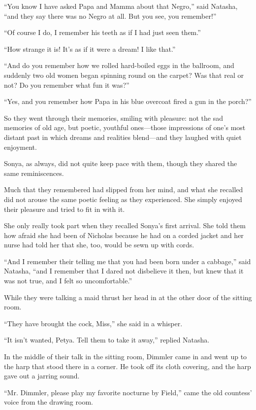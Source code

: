 ``You know I have asked Papa and Mamma about that Negro,'' said
Natasha, ``and they say there was no Negro at all. But you see,
you remember!''

``Of course I do, I remember his teeth as if I had just seen
them.''

``How strange it is! It's as if it were a dream! I like that.''

``And do you remember how we rolled hard-boiled eggs in the
ballroom, and suddenly two old women began spinning round on the
carpet? Was that real or not? Do you remember what fun it was?''

``Yes, and you remember how Papa in his blue overcoat fired a gun
in the porch?''

So they went through their memories, smiling with pleasure: not
the sad memories of old age, but poetic, youthful ones---those
impressions of one's most distant past in which dreams and
realities blend---and they laughed with quiet enjoyment.

Sonya, as always, did not quite keep pace with them, though they
shared the same reminiscences.

Much that they remembered had slipped from her mind, and what she
recalled did not arouse the same poetic feeling as they
experienced. She simply enjoyed their pleasure and tried to fit
in with it.

She only really took part when they recalled Sonya's first
arrival. She told them how afraid she had been of Nicholas
because he had on a corded jacket and her nurse had told her that
she, too, would be sewn up with cords.

``And I remember their telling me that you had been born under a
cabbage,'' said Natasha, ``and I remember that I dared not
disbelieve it then, but knew that it was not true, and I felt so
uncomfortable.''

While they were talking a maid thrust her head in at the other
door of the sitting room.

``They have brought the cock, Miss,'' she said in a whisper.

``It isn't wanted, Petya. Tell them to take it away,'' replied
Natasha.

In the middle of their talk in the sitting room, Dimmler came in
and went up to the harp that stood there in a corner. He took off
its cloth covering, and the harp gave out a jarring sound.

``Mr. Dimmler, please play my favorite nocturne by Field,'' came
the old countess' voice from the drawing room.

